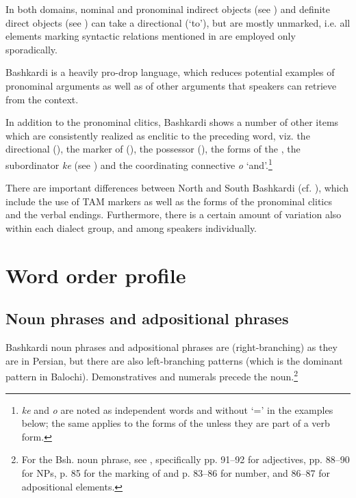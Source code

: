 \documentclass[output=paper,colorlinks,citecolor=brown]{langscibook}
\begin{document}
In both domains, nominal and pronominal indirect objects (see ) and definite direct objects (see ) can take a directional  (`to'), but are mostly unmarked, i.e. all elements marking syntactic relations mentioned in  are employed only sporadically.

Bashkardi is a heavily pro-drop language, which reduces potential examples of pronominal arguments as well as of other arguments that speakers can retrieve from the context. 


In addition to the pronominal clitics, Bashkardi shows a number of other items which are consistently realized as enclitic to the preceding word, viz. the directional  (), the marker of  (), the possessor  (), the forms of the , the subordinator \textit{ke} (see ) and the coordinating connective \textit{o} `and'.\footnote{\textit{ke} and \textit{o} are noted as independent words and without `=' in the examples below; the same applies to the forms of the  unless they are part of a verb form.}

There are important differences between North and South Bashkardi (cf. ), which include the use of TAM markers as well as the forms of the pronominal clitics and the verbal endings. Furthermore, there is a certain amount of variation also within each dialect group, and among speakers individually.

\section{Word order profile}\label{Bashkardi:ss:2}


\subsection{Noun phrases and adpositional phrases}\label{Bashkardi:ss:2.1}

\begin{sloppypar}
Bashkardi noun phrases and adpositional phrases are  (right-branching) as they are in Persian, but there are also left-branching patterns (which is the dominant pattern in Balochi). Demonstratives and numerals precede the noun.\footnote{For the Bsh. noun phrase, see \citet{korn_notes_2017}, specifically pp. 91--92 for adjectives, pp. 88--90 for  NPs, p. 85 for the marking of  and p. 83--86 for number, and 86--87 for adpositional elements.}
\end{sloppypar}
\end{document}
